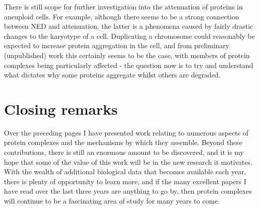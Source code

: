 \documentclass[a4paper,11pt,twoside,openright]{scrbook}
\begin{document}
There is still scope for further investigation into the attenuation of proteins
in aneuploid cells. For example, although there seems to be a strong connection
between NED and attenuation, the latter is a phenomena caused by fairly drastic
changes to the karyotype of a cell. Duplicating a chromosome could reasonably be
expected to increase protein aggregation in the cell, and from preliminary
(unpublished) work this certainly seems to be the case, with members of protein
complexes being particularly affected - the question now is to try and
understand what dictates why some proteins aggregate whilst others are degraded.

\section{Closing remarks}
Over the preceding pages I have presented work relating to numerous aspects of
protein complexes and the mechanisms by which they assemble. Beyond these
contributions, there is still an enormous amount to be discovered, and it is my
hope that some of the value of this work will be in the new research it
motivates. With the wealth of additional biological data that becomes available
each year, there is plenty of opportunity to learn more, and if the many
excellent papers I have read over the last three years are anything to go by,
then protein complexes will continue to be a fascinating area of study for many
years to come.
\end{document}
